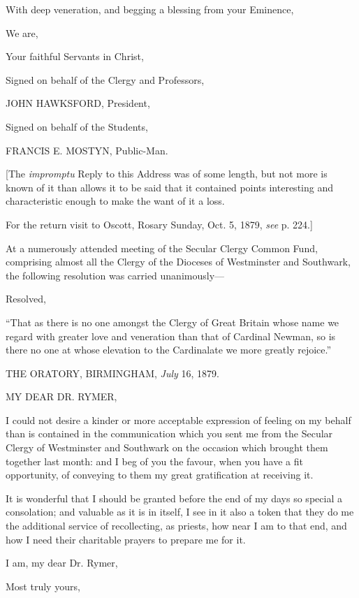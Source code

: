 With deep veneration, and begging a blessing from your Eminence,

We are,

Your faithful Servants in Christ,

Signed on behalf of the Clergy and Professors,

JOHN HAWKSFORD, President,

Signed on behalf of the Students,

FRANCIS E. MOSTYN,
Public-Man.

[The \emph{impromptu} Reply to this Address was of some length, but
not more is known of it than allows it to be said that it contained
points interesting and characteristic enough to make the want of it a
loss.

For the return visit to Oscott, Rosary Sunday, Oct. 5, 1879, \emph{see}
p. 224.]


At a numerously attended meeting of the Secular Clergy Common Fund,
comprising almost all the Clergy of the Dioceses of Westminster and
Southwark, the following resolution was carried unanimously—

Resolved,

``That as there is no one amongst the Clergy of Great
Britain whose name we regard with greater love and veneration than
that of Cardinal Newman, so is there no one at whose elevation to the
Cardinalate we more greatly rejoice.''

THE ORATORY, BIRMINGHAM,
\emph{July} 16, 1879.

MY DEAR DR.
RYMER,

I could not desire a kinder or more acceptable expression of feeling
on my behalf than is contained in the communication which you sent me
from the Secular Clergy of Westminster and Southwark on the occasion
which brought them together last month: and I beg of you the favour,
when you have a fit opportunity, of conveying to them my great
gratification at receiving it.

It is wonderful that I should be granted before the end of my days
so special a consolation; and valuable as it is in itself, I see in it
also a token that they do me the additional service of recollecting,
as priests, how near I am to that end, and how I need their charitable
prayers to prepare me for it.

I am, my dear Dr. Rymer,

Most truly yours,

